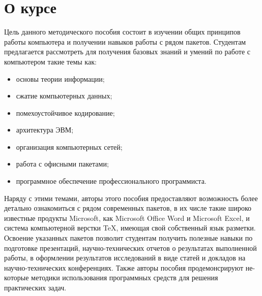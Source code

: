 \section{О курсе}

Цель данного методического пособия состоит в изучении общих принципов работы компьютера и получении навыков работы с рядом пакетов. Студентам предлагается рассмотреть для получения базовых знаний и умений по работе с компьютером такие темы как: 
\begin{itemize}

\item основы теории информации;
\item сжатие компьютерных данных;
\item помехоустойчивое кодирование;
\item архитектура ЭВМ;
\item организация компьютерных сетей;
\item работа с офисными пакетами;
\item программное обеспечение профессионального программиста.
\end{itemize}

Наряду с этими темами, авторы этого пособия предоставляют возможность более детально ознакомиться с рядом современных пакетов, в их числе такие широко известные продукты Microsoft, как Microsoft Office Word и Microsoft Excel, и система компьютерной верстки TeX, имеющая свой собственный язык разметки. Освоение указанных пакетов позволит студентам получить полезные навыки по подготовке презентаций, научно-технических отчетов о результатах выполненной работы, в оформлении результатов исследований в виде статей и докладов на научно-технических конференциях. Также авторы пособия продемонсрируют не-которые методики использования программных средств для решения практических задач.
